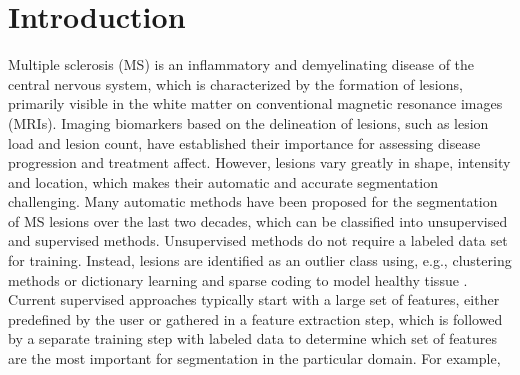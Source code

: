 \section{Introduction}


Multiple sclerosis (MS) is an inflammatory and demyelinating disease of the
central nervous system, which is characterized by the formation of lesions,
primarily visible in the white matter on conventional magnetic resonance images
(MRIs). Imaging biomarkers based on the delineation of lesions, such as lesion
load and lesion count, have established their importance for assessing disease
progression and treatment affect. However, lesions vary greatly in shape,
intensity and location, which makes their automatic and accurate segmentation
challenging. Many automatic methods have been proposed for the segmentation of
MS lesions over the last two decades, which can be classified into unsupervised
and supervised methods. Unsupervised methods do not require a labeled data set
for training. Instead, lesions are identified as an outlier class using, e.g.,
clustering methods \cite{souplet2008} or dictionary learning and sparse coding
to model healthy tissue \cite{weiss2013}. Current supervised approaches
typically start with a large set of features, either predefined by the user
\cite{geremia2010} or gathered in a feature extraction step, which is followed
by a separate training step with labeled data to determine which set of features
are the most important for segmentation in the particular domain. For example,
